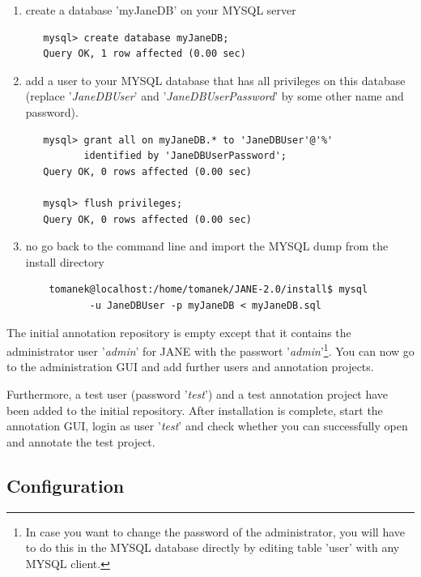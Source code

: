 \documentclass[DIV12,english,11pt,halfparskip]{scrartcl}
\begin{document}
\begin{enumerate}
 \item create a database 'myJaneDB' on your MYSQL server
\begin{verbatim}
   mysql> create database myJaneDB;
   Query OK, 1 row affected (0.00 sec)
\end{verbatim}

 \item add a user to your MYSQL database that has all privileges on
   this database (replace '\emph{JaneDBUser}' and
   '\emph{JaneDBUserPassword}' by some other name and password).
\begin{verbatim}
   mysql> grant all on myJaneDB.* to 'JaneDBUser'@'%'
          identified by 'JaneDBUserPassword';
   Query OK, 0 rows affected (0.00 sec)

   mysql> flush privileges;
   Query OK, 0 rows affected (0.00 sec)
\end{verbatim}

 \item no go back to the command line and import the MYSQL dump from
   the install directory
\begin{verbatim}
    tomanek@localhost:/home/tomanek/JANE-2.0/install$ mysql 
           -u JaneDBUser -p myJaneDB < myJaneDB.sql
\end{verbatim}
\end{enumerate}


The initial annotation repository is empty except that it contains the
administrator user '\emph{admin}' for JANE with the passwort
'\emph{admin}'\footnote{In case you want to change the password of the
  administrator, you will have to do this in the MYSQL database
  directly by editing table 'user' with any MYSQL client.}. You can
now go to the administration GUI and add further users and annotation
projects.

  Furthermore, a test user (password '\emph{test}') and a test
  annotation project have been added to the initial repository. After
  installation is complete, start the annotation GUI, login as user
  '\emph{test}' and check whether you can successfully open and
  annotate the test project.



\subsection{Configuration}
\end{document}
